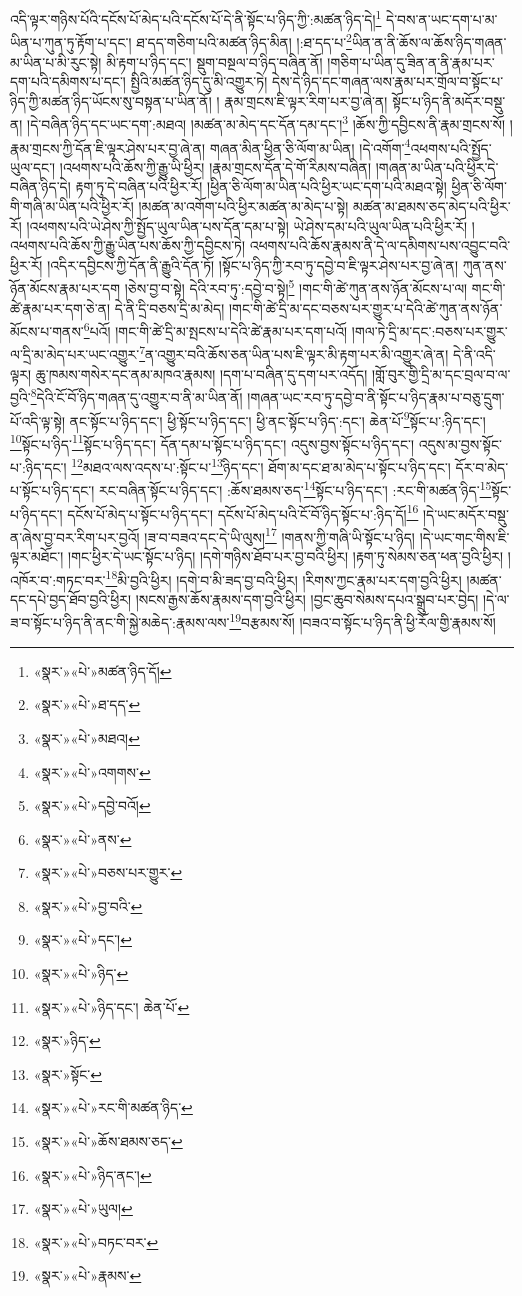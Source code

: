 འདི་ལྟར་གཉིས་པོའི་དངོས་པོ་མེད་པའི་དངོས་པོ་དེ་ནི་སྟོང་པ་ཉིད་ཀྱི་:མཚན་ཉིད་དེ།\footnote{«སྣར་»«པེ་»མཚན་ཉིད་དོ།} དེ་བས་ན་ཡང་དག་པ་མ་ཡིན་པ་ཀུན་ཏུ་རྟོག་པ་དང་། ཐ་དད་གཅིག་པའི་མཚན་ཉིད་མིན། །:ཐ་དད་པ་\footnote{«སྣར་»«པེ་»ཐ་དད་}ཡིན་ན་ནི་ཆོས་ལ་ཆོས་ཉིད་གཞན་མ་ཡིན་པ་མི་རུང་སྟེ། མི་རྟག་པ་ཉིད་དང་། སྡུག་བསྔལ་བ་ཉིད་བཞིན་ནོ། །གཅིག་པ་ཡིན་དུ་ཟིན་ན་ནི་རྣམ་པར་དག་པའི་དམིགས་པ་དང་། སྤྱིའི་མཚན་ཉིད་དུ་མི་འགྱུར་ཏེ། དེས་དེ་ཉིད་དང་གཞན་ལས་རྣམ་པར་གྲོལ་བ་སྟོང་པ་ཉིད་ཀྱི་མཚན་ཉིད་ཡོངས་སུ་བསྟན་པ་ཡིན་ནོ། །
རྣམ་གྲངས་ཇི་ལྟར་རིག་པར་བྱ་ཞེ་ན། སྟོང་པ་ཉིད་ནི་མདོར་བསྡུ་ན། །དེ་བཞིན་ཉིད་དང་ཡང་དག་:མཐའ། །མཚན་མ་མེད་དང་དོན་དམ་དང་།\footnote{«སྣར་»«པེ་»མཐའ།} །ཆོས་ཀྱི་དབྱིངས་ནི་རྣམ་གྲངས་སོ། །རྣམ་གྲངས་ཀྱི་དོན་ཇི་ལྟར་ཤེས་པར་བྱ་ཞེ་ན། གཞན་མིན་ཕྱིན་ཅི་ལོག་མ་ཡིན། །དེ་འགོག་\footnote{«སྣར་»«པེ་»འགགས་}འཕགས་པའི་སྤྱོད་ཡུལ་དང་། །འཕགས་པའི་ཆོས་ཀྱི་རྒྱུ་ཡི་ཕྱིར། །རྣམ་གྲངས་དོན་དེ་གོ་རིམས་བཞིན། །གཞན་མ་ཡིན་པའི་ཕྱིར་དེ་བཞིན་ཉིད་དེ། རྟག་ཏུ་དེ་བཞིན་པའི་ཕྱིར་རོ། །ཕྱིན་ཅི་ལོག་མ་ཡིན་པའི་ཕྱིར་ཡང་དག་པའི་མཐའ་སྟེ། ཕྱིན་ཅི་ལོག་གི་གཞི་མ་ཡིན་པའི་ཕྱིར་རོ། །མཚན་མ་འགོག་པའི་ཕྱིར་མཚན་མ་མེད་པ་སྟེ། མཚན་མ་ཐམས་ཅད་མེད་པའི་ཕྱིར་རོ། །འཕགས་པའི་ཡེ་ཤེས་ཀྱི་སྤྱོད་ཡུལ་ཡིན་པས་དོན་དམ་པ་སྟེ། ཡེ་ཤེས་དམ་པའི་ཡུལ་ཡིན་པའི་ཕྱིར་རོ། །འཕགས་པའི་ཆོས་ཀྱི་རྒྱུ་ཡིན་པས་ཆོས་ཀྱི་དབྱིངས་ཏེ། འཕགས་པའི་ཆོས་རྣམས་ནི་དེ་ལ་དམིགས་པས་འབྱུང་བའི་ཕྱིར་རོ། །འདིར་དབྱིངས་ཀྱི་དོན་ནི་རྒྱུའི་དོན་ཏོ། །སྟོང་པ་ཉིད་ཀྱི་རབ་ཏུ་དབྱེ་བ་ཇི་ལྟར་ཤེས་པར་བྱ་ཞེ་ན། ཀུན་ནས་ཉོན་མོངས་རྣམ་པར་དག །ཅེས་བྱ་བ་སྟེ། དེའི་རབ་ཏུ་:དབྱེ་བ་སྟེ།\footnote{«སྣར་»«པེ་»དབྱེ་བའོ།} །གང་གི་ཚེ་ཀུན་ནས་ཉོན་མོངས་པ་ལ། གང་གི་ཚེ་རྣམ་པར་དག་ཅེ་ན། དེ་ནི་དྲི་བཅས་དྲི་མ་མེད། །གང་གི་ཚེ་དྲི་མ་དང་བཅས་པར་གྱུར་པ་དེའི་ཚེ་ཀུན་ནས་ཉོན་མོངས་པ་གནས་\footnote{«སྣར་»«པེ་»ནས་}པའོ། །གང་གི་ཚེ་དྲི་མ་སྤངས་པ་དེའི་ཚེ་རྣམ་པར་དག་པའོ། །གལ་ཏེ་དྲི་མ་དང་:བཅས་པར་གྱུར་ལ་དྲི་མ་མེད་པར་ཡང་འགྱུར་\footnote{«སྣར་»«པེ་»བཅས་པར་གྱུར་}ན་འགྱུར་བའི་ཆོས་ཅན་ཡིན་པས་ཇི་ལྟར་མི་རྟག་པར་མི་འགྱུར་ཞེ་ན། དེ་ནི་འདི་ལྟར། ཆུ་ཁམས་གསེར་དང་ནམ་མཁའ་རྣམས། །དག་པ་བཞིན་དུ་དག་པར་འདོད། །གློ་བུར་གྱི་དྲི་མ་དང་བྲལ་བ་ལ་བྱའི་\footnote{«སྣར་»«པེ་»བྱ་བའི་}དེའི་ངོ་བོ་ཉིད་གཞན་དུ་འགྱུར་བ་ནི་མ་ཡིན་ནོ། །གཞན་ཡང་རབ་ཏུ་དབྱེ་བ་ནི་སྟོང་པ་ཉིད་རྣམ་པ་བཅུ་དྲུག་པོ་འདི་ལྟ་སྟེ། ནང་སྟོང་པ་ཉིད་དང་། ཕྱི་སྟོང་པ་ཉིད་དང་། ཕྱི་ནང་སྟོང་པ་ཉིད་:དང་། ཆེན་པོ་\footnote{«སྣར་»«པེ་»དང་།}སྟོང་པ་:ཉིད་དང་། \footnote{«སྣར་»«པེ་»ཉིད་}སྟོང་པ་ཉིད་\footnote{«སྣར་»«པེ་»ཉིད་དང་། ཆེན་པོ་}སྟོང་པ་ཉིད་དང་། དོན་དམ་པ་སྟོང་པ་ཉིད་དང་། འདུས་བྱས་སྟོང་པ་ཉིད་དང་། འདུས་མ་བྱས་སྟོང་པ་:ཉིད་དང་། \footnote{«སྣར་»ཉིད་}མཐའ་ལས་འདས་པ་:སྟོང་པ་\footnote{«སྣར་»སྟོང་}ཉིད་དང་། ཐོག་མ་དང་ཐ་མ་མེད་པ་སྟོང་པ་ཉིད་དང་། དོར་བ་མེད་པ་སྟོང་པ་ཉིད་དང་། རང་བཞིན་སྟོང་པ་ཉིད་དང་། :ཆོས་ཐམས་ཅད་\footnote{«སྣར་»«པེ་»རང་གི་མཚན་ཉིད་}སྟོང་པ་ཉིད་དང་། :རང་གི་མཚན་ཉིད་\footnote{«སྣར་»«པེ་»ཆོས་ཐམས་ཅད་}སྟོང་པ་ཉིད་དང་། དངོས་པོ་མེད་པ་སྟོང་པ་ཉིད་དང་། དངོས་པོ་མེད་པའི་ངོ་བོ་ཉིད་སྟོང་པ་:ཉིད་དོ།\footnote{«སྣར་»«པེ་»ཉིད་ནང་།} །དེ་ཡང་མདོར་བསྡུ་ན་ཞེས་བྱ་བར་རིག་པར་བྱའོ། །ཟ་བ་བཟའ་དང་དེ་ཡི་ལུས།\footnote{«སྣར་»«པེ་»ཡུལ།} །གནས་ཀྱི་གཞི་ཡི་སྟོང་པ་ཉིད། །དེ་ཡང་གང་གིས་ཇི་ལྟར་མཐོང་། །གང་ཕྱིར་དེ་ཡང་སྟོང་པ་ཉིད། །དགེ་གཉིས་ཐོབ་པར་བྱ་བའི་ཕྱིར། །རྟག་ཏུ་སེམས་ཅན་ཕན་བྱའི་ཕྱིར། །འཁོར་བ་:གཏང་བར་\footnote{«སྣར་»«པེ་»བཏང་བར་}མི་བྱའི་ཕྱིར། །དགེ་བ་མི་ཟད་བྱ་བའི་ཕྱིར། །རིགས་ཀྱང་རྣམ་པར་དག་བྱའི་ཕྱིར། །མཚན་དང་དཔེ་བྱད་ཐོབ་བྱའི་ཕྱིར། །སངས་རྒྱས་ཆོས་རྣམས་དག་བྱའི་ཕྱིར། །བྱང་ཆུབ་སེམས་དཔའ་སྒྲུབ་པར་བྱེད། །དེ་ལ་ཟ་བ་སྟོང་པ་ཉིད་ནི་ནང་གི་སྐྱེ་མཆེད་:རྣམས་ལས་\footnote{«སྣར་»«པེ་»རྣམས་}བརྩམས་སོ། །བཟའ་བ་སྟོང་པ་ཉིད་ནི་ཕྱི་རོལ་གྱི་རྣམས་སོ། 